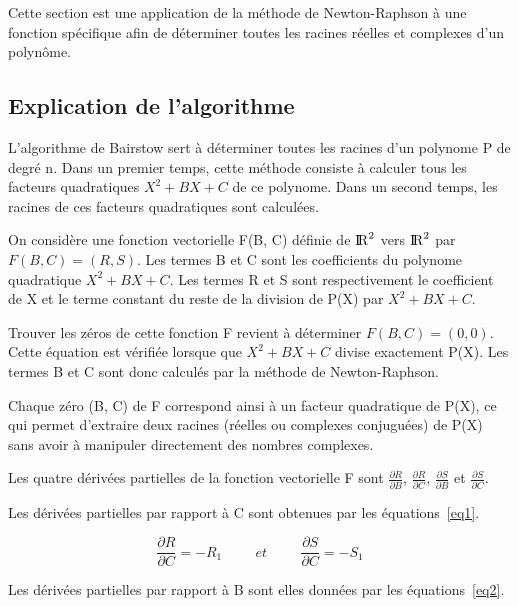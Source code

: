 Cette section est une application de la méthode de Newton-Raphson à une fonction spécifique afin de déterminer toutes les racines réelles et complexes d'un polynôme.

\subsection{Explication de l'algorithme}

L'algorithme de Bairstow sert à déterminer toutes les racines d'un polynome P de degré n. Dans un premier temps, cette méthode consiste à calculer tous les facteurs quadratiques $X^{2} + BX + C$ de ce polynome. Dans un second temps, les racines de ces facteurs quadratiques sont calculées.

\bigskip

\indent On considère une fonction vectorielle F(B, C) définie de $\mathrm{I\!R}^2$ vers $\mathrm{I\!R}^2$ par $F(B, C) = (R, S)$. Les termes B et C sont les coefficients du polynome quadratique $X^{2} + BX + C$. Les termes R et S sont respectivement le coefficient de X et le terme constant du reste de la division de P(X) par $X^{2} + BX + C$.

\bigskip

\indent Trouver les zéros de  cette fonction F revient à déterminer $F(B, C) = (0, 0)$.
Cette équation est vérifiée lorsque que $X^{2} + BX + C$ divise exactement P(X). Les termes B et C sont donc calculés par la méthode de Newton-Raphson.

\bigskip

\indent Chaque zéro (B, C) de F correspond ainsi à un facteur quadratique de P(X), ce qui permet d'extraire deux racines (réelles ou complexes conjuguées) de P(X) sans avoir à manipuler directement des nombres complexes.

Les quatre dérivées partielles de la fonction vectorielle F sont $\frac{\partial R}{\partial B}$, $\frac{\partial R}{\partial C}$, $\frac{\partial S}{\partial B}$ et $\frac{\partial S}{\partial C}$.
\bigskip

\noindent Les dérivées partielles par rapport à C sont obtenues par les équations~\eqref{eq1}.

\begin{equation}
    \frac{\partial R}{\partial C} = -R_1 \hspace{1cm} et \hspace{1cm}
    \frac{\partial S}{\partial C} = -S_1
    \label{eq1}
\end{equation}

\noindent Les dérivées partielles par rapport à B sont elles données par les équations~\eqref{eq2}.

